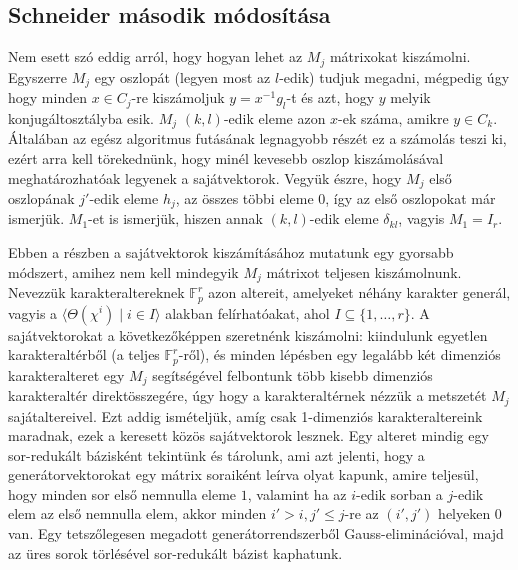 \subsection{Schneider második módosítása}
\label{subsec:bdssch2}
Nem esett szó eddig arról, hogy hogyan lehet az $M_j$ mátrixokat kiszámolni.
Egyszerre $M_j$ egy oszlopát (legyen most az $l$-edik) tudjuk megadni, mégpedig úgy hogy minden $x \in C_j$-re kiszámoljuk
$y=x^{-1}g_l$-t és azt, hogy $y$ melyik konjugáltosztályba esik.
$M_j$ $(k,l)$-edik eleme azon $x$-ek száma, amikre $y\in C_k$.
Általában az egész algoritmus futásának legnagyobb részét ez a számolás teszi ki, ezért arra kell törekednünk, hogy minél kevesebb oszlop kiszámolásával meghatározhatóak legyenek a sajátvektorok.
Vegyük észre, hogy $M_j$ első oszlopának $j'$-edik eleme $h_j$, az összes többi eleme $0$, így az első oszlopokat már ismerjük.
$M_1$-et is ismerjük, hiszen annak $(k,l)$-edik eleme $\delta_{kl}$, vagyis $M_1=I_r$.

Ebben a részben a sajátvektorok kiszámításához mutatunk egy gyorsabb módszert, amihez nem kell mindegyik $M_j$ mátrixot teljesen kiszámolnunk.
Nevezzük karakteraltereknek $\mathbb{F}_p^r$ azon altereit, amelyeket néhány karakter generál, vagyis a $\langle \Theta(\chi^i) \mid i \in I \rangle$ alakban felírhatóakat, ahol $I \subseteq \{1,\dots,r\}$.
A sajátvektorokat a következőképpen szeretnénk kiszámolni:
kiindulunk egyetlen karakteraltérből (a teljes $\mathbb{F}_p^r$-ről), és minden lépésben egy legalább két dimenziós karakteralteret egy $M_j$ segítségével felbontunk több kisebb dimenziós karakteraltér direktösszegére,
úgy hogy a karakteraltérnek nézzük a metszetét $M_j$ sajátaltereivel.
Ezt addig ismételjük, amíg csak 1-dimenziós karakteraltereink maradnak, ezek a keresett közös sajátvektorok lesznek.
Egy alteret mindig egy sor-redukált bázisként tekintünk és tárolunk, ami azt jelenti, hogy a generátorvektorokat egy mátrix soraiként leírva olyat kapunk,
amire teljesül, hogy minden sor első nemnulla eleme $1$, valamint ha az $i$-edik sorban a $j$-edik elem az első nemnulla elem, akkor minden $i' > i, j'\le j$-re az $(i',j')$ helyeken 0 van.
Egy tetszőlegesen megadott generátorrendszerből Gauss-eliminációval, majd az üres sorok törlésével sor-redukált bázist kaphatunk.

